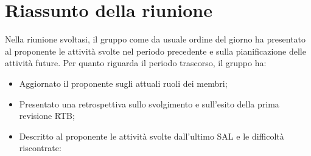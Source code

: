 \section{Riassunto della riunione}
Nella riunione svoltasi, il gruppo come da usuale ordine del giorno ha presentato al proponente le attività svolte nel periodo precedente e sulla pianificazione delle attività future. 
Per quanto riguarda il periodo trascorso, il gruppo ha:
\begin{itemize}
    \item Aggiornato il proponente sugli attuali ruoli dei membri;
    \item Presentato una retrospettiva sullo svolgimento e sull'esito della prima revisione RTB;
    \item Descritto al proponente le attività svolte dall'ultimo SAL e le difficoltà riscontrate:
\end{itemize}


